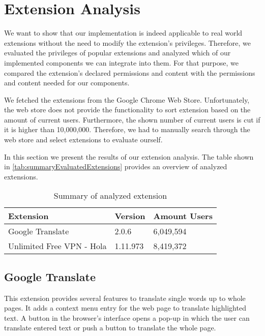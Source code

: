 
\chapter{Extension Analysis}
	
	We want to show that our implementation is indeed applicable to real world extensions without the need to modify the extension's privileges. Therefore, we evaluated the privileges of popular extensions and analyzed which of our implemented components we can integrate into them. For that purpose, we compared the extension's declared permissions and content with the permissions and content needed for our components. 
	
	We fetched the extensions from the Google Chrome Web Store. Unfortunately, the web store does not provide the functionality to sort extension based on the amount of current users. Furthermore, the shown number of current users is cut if it is higher than 10,000,000. Therefore, we had to manually search through the web store and select extensions to evaluate ourself. 
	
	In this section we present the results of our extension analysis. The table shown in \autoref{tab:summaryEvaluatedExtensions} provides an overview of analyzed extensions.
	
	\begin{table}[h]
		\centering
		\begin{tabular}{|l|l|l|} \hline
			\textbf{Extension} & \textbf{Version} & \textbf{Amount Users} \\ \hline
			Google Translate & 2.0.6 & 6,049,594 \\ 
			Unlimited Free VPN - Hola & 1.11.973 & 8,419,372 \\ \hline
		\end{tabular}
		\caption{Summary of analyzed extension}
		\label{tab:summaryEvaluatedExtensions}
	\end{table}
	
	
\section{Google Translate}
	This extension provides several features to translate single words up to whole pages. It adds a context menu entry for the web page to translate highlighted text. A button in the browser's interface opens a pop-up in which the user can translate entered text or push a button to translate the whole page.
	
